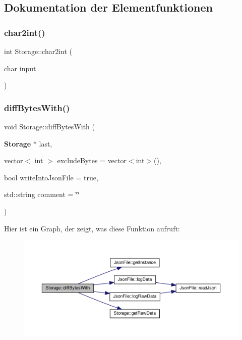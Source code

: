 \subsection{Dokumentation der Elementfunktionen}
\mbox{\label{class_storage_af467ed6bef46d8d7f5286ae06d9f3289}} 
\subsubsection{char2int()}
{\footnotesize\ttfamily int Storage\+::char2int (\begin{DoxyParamCaption}\item[{char}]{input }\end{DoxyParamCaption})}

\mbox{\label{class_storage_af785114f92fc0ace0eedf9847db00c44}} 
\subsubsection{diff\+Bytes\+With()}
{\footnotesize\ttfamily void Storage\+::diff\+Bytes\+With (\begin{DoxyParamCaption}\item[{\textbf{ Storage} $\ast$}]{last,  }\item[{vector$<$ int $>$}]{exclude\+Bytes = {\ttfamily vector$<$int$>$()},  }\item[{bool}]{write\+Into\+Json\+File = {\ttfamily true},  }\item[{std\+::string}]{comment = {\ttfamily \char`\"{}\char`\"{}} }\end{DoxyParamCaption})}

Hier ist ein Graph, der zeigt, was diese Funktion aufruft\+:\nopagebreak
\begin{figure}[H]
\begin{center}
\leavevmode
\includegraphics[width=350pt]{class_storage_af785114f92fc0ace0eedf9847db00c44_cgraph}
\end{center}
\end{figure}
\mbox{\label{class_storage_aaaaec44a9862aef40bba754f49c2ee41}} 
